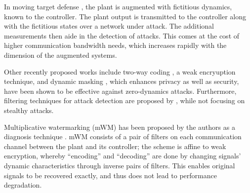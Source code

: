 In moving target defense \citep{griffioen2020moving}, the plant is augmented with fictitious dynamics, known to the controller. The plant output is transmitted to the controller along with the fictitious states over a network under attack. 
The additional measurements then aide in the detection of attacks. 
This comes at the cost of higher communication bandwidth needs, which increases rapidly with the dimension of the augmented systems.

Other recently proposed works include two-way coding \citep{fang2019two}, a weak encryuption technique, and dynamic masking \citep{abdalmoaty2023privacy}, which enhances privacy as well as security, have been shown to be effective against zero-dynamics attacks.
Furthermore, filtering techniques for attack detection are proposed by \cite{murguia2020security,hashemi2022codesign,escudero2023safety}, while not focusing on stealthy attacks.

Multiplicative watermarking (mWM) has been proposed by the authors as a diagnosis technique \citep{ferrari2020switching}. mWM consists of a pair of filters on each communication channel between the plant and its controller; the scheme is affine to weak encryption, whereby ``encoding'' and ``decoding'' are done by changing signals' dynamic characteristics through inverse pairs of filters. This enables original signals to be recovered exactly, and thus does not lead to performance degradation.

